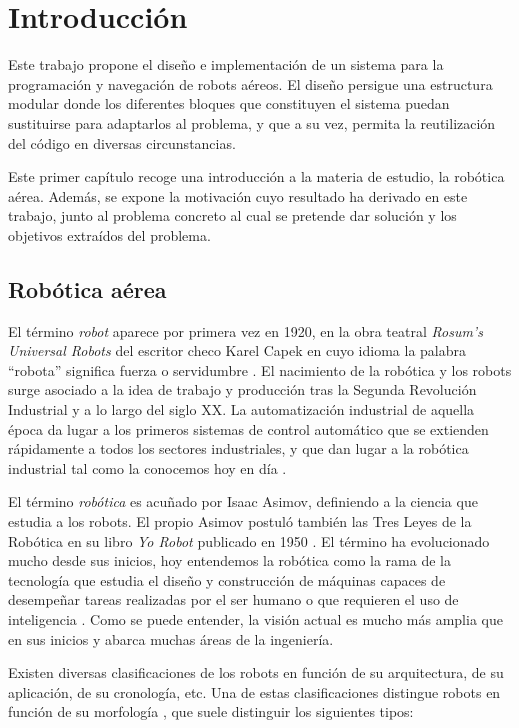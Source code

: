 \documentclass[../main.tex]{subfiles}
\begin{document}
\chapter{Introducción} \label{cap:intro}
Este trabajo propone el diseño e implementación de un sistema para la programación y navegación de robots aéreos. El diseño persigue una estructura modular donde los diferentes bloques que constituyen el sistema puedan sustituirse para adaptarlos al problema, y que a su vez, permita la reutilización del código en diversas circunstancias.

Este primer capítulo recoge una introducción a la materia de estudio, la robótica aérea. Además, se expone la motivación cuyo resultado ha derivado en este trabajo, junto al problema concreto al cual se  pretende dar solución y los objetivos extraídos del problema.

\section{Robótica aérea} \label{section:intro-contexto}
El término \emph{robot} aparece por primera vez en 1920, en la obra teatral \emph{Rosum's Universal Robots} del escritor checo Karel Capek en cuyo idioma la palabra ``robota'' significa fuerza o servidumbre \cite{martin2007historia}. El nacimiento de la robótica y los robots surge asociado a la idea de trabajo y producción tras la Segunda Revolución Industrial y a lo largo del siglo XX. La automatización industrial de aquella época da lugar a los primeros sistemas de control automático que se extienden rápidamente a todos los sectores industriales, y que dan lugar a la robótica industrial tal como la conocemos hoy en día \cite{baturone2005robotica}.

El término \emph{robótica} es acuñado por Isaac Asimov, definiendo a la ciencia que estudia a los robots. El propio Asimov postuló también las Tres Leyes de la Robótica en su libro \emph{Yo Robot} publicado en 1950 \cite{martin2007historia}. El término ha evolucionado mucho desde sus inicios, hoy entendemos la robótica como la rama de la tecnología que estudia el diseño y construcción de máquinas capaces de desempeñar tareas realizadas por el ser humano o que requieren el uso de inteligencia \cite{rae}. Como se puede entender, la visión actual es mucho más amplia que en sus inicios y abarca muchas áreas de la ingeniería.

Existen diversas clasificaciones de los robots en función de su arquitectura, de su aplicación, de su cronología, etc. Una de estas clasificaciones distingue robots en función de su morfología \cite{de2006robotica}, que suele distinguir los siguientes tipos:
\end{document}
